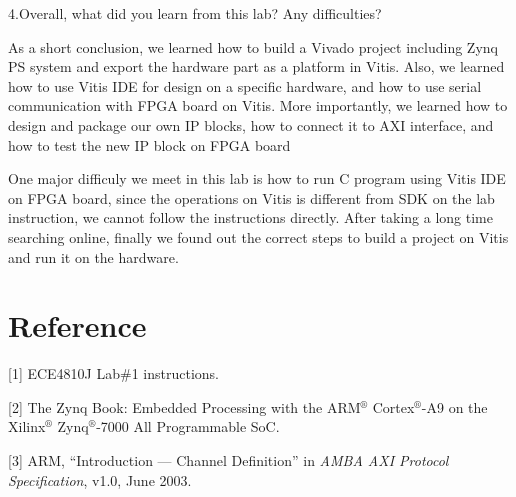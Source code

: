 \documentclass[a4paper]{article}
\begin{document}
\par
4.Overall, what did you learn from this lab? Any difficulties?
\par
As a short conclusion, we learned how to build a Vivado project including Zynq PS system and export the hardware part as a platform in Vitis. Also, we learned how to use Vitis IDE for design on a specific hardware, and how to use serial communication with FPGA board on Vitis. More importantly, we learned how to design and package our own IP blocks, how to connect it to AXI interface, and how to test the new IP block on FPGA board
\par
One major difficuly we meet in this lab is how to run C program using Vitis IDE on FPGA board, since the operations on Vitis is different from SDK on the lab instruction, we cannot follow the instructions directly. After taking a long time searching online, finally we found out the correct steps to build a project on Vitis and run it on the hardware.
\section{Reference}
[1] ECE4810J Lab\#1 instructions.

[2] The Zynq Book: Embedded Processing with the ARM$^\circledR$ Cortex$^\circledR$-A9 on the Xilinx$^\circledR$ Zynq$^\circledR$-7000 All Programmable SoC.

[3] ARM, “Introduction — Channel Definition” in \textit{AMBA AXI Protocol Specification}, v1.0, June 2003.
\end{document}

